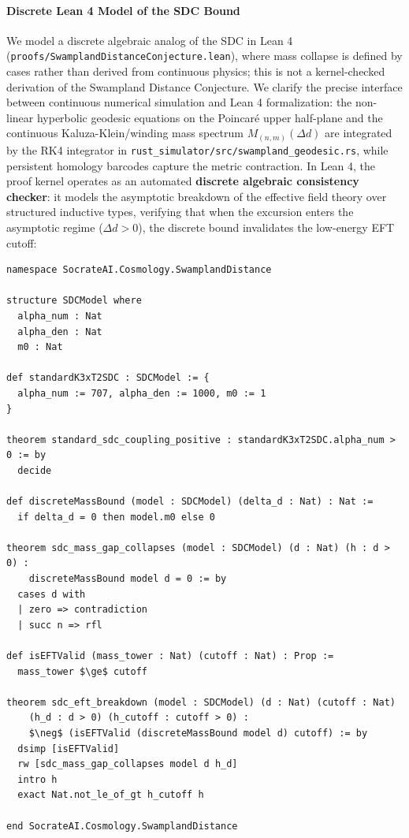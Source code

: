 \documentclass[11pt,a4paper]{article}
\begin{document}
\paragraph{Discrete Lean 4 Model of the SDC Bound}
We model a discrete algebraic analog of the SDC in Lean 4 (\texttt{proofs/SwamplandDistanceConjecture.lean}), where mass collapse is defined by cases rather than derived from continuous physics; this is not a kernel-checked derivation of the Swampland Distance Conjecture. We clarify the precise interface between continuous numerical simulation and Lean 4 formalization: the non-linear hyperbolic geodesic equations on the Poincar\'e upper half-plane and the continuous Kaluza-Klein/winding mass spectrum $M_{(n, m)}(\Delta d)$ are integrated by the RK4 integrator in \texttt{rust\_simulator/src/swampland\_geodesic.rs}, while persistent homology barcodes capture the metric contraction. In Lean 4, the proof kernel operates as an automated \textbf{discrete algebraic consistency checker}: it models the asymptotic breakdown of the effective field theory over structured inductive types, verifying that when the excursion enters the asymptotic regime ($\Delta d > 0$), the discrete bound invalidates the low-energy EFT cutoff:

\begin{lstlisting}[language=lean, caption={Lean 4 Discrete Model of the Swampland Distance Conjecture Bound}, label={lst:sdc_proof}]
namespace SocrateAI.Cosmology.SwamplandDistance

structure SDCModel where
  alpha_num : Nat
  alpha_den : Nat
  m0 : Nat

def standardK3xT2SDC : SDCModel := {
  alpha_num := 707, alpha_den := 1000, m0 := 1
}

theorem standard_sdc_coupling_positive : standardK3xT2SDC.alpha_num > 0 := by
  decide

def discreteMassBound (model : SDCModel) (delta_d : Nat) : Nat :=
  if delta_d = 0 then model.m0 else 0

theorem sdc_mass_gap_collapses (model : SDCModel) (d : Nat) (h : d > 0) :
    discreteMassBound model d = 0 := by
  cases d with
  | zero => contradiction
  | succ n => rfl

def isEFTValid (mass_tower : Nat) (cutoff : Nat) : Prop :=
  mass_tower $\ge$ cutoff

theorem sdc_eft_breakdown (model : SDCModel) (d : Nat) (cutoff : Nat)
    (h_d : d > 0) (h_cutoff : cutoff > 0) :
    $\neg$ (isEFTValid (discreteMassBound model d) cutoff) := by
  dsimp [isEFTValid]
  rw [sdc_mass_gap_collapses model d h_d]
  intro h
  exact Nat.not_le_of_gt h_cutoff h

end SocrateAI.Cosmology.SwamplandDistance
\end{lstlisting}
\end{document}
